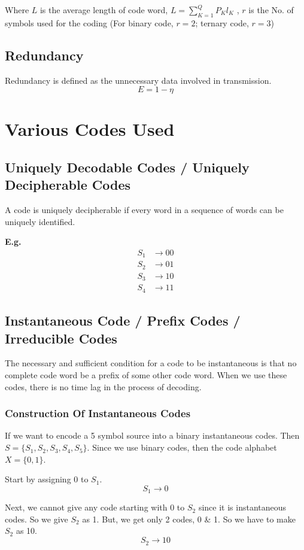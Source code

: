 \documentclass[12pt]{article}
\begin{document}
Where $L$ is the average length of code word, $L = \sum_{K=1}^{Q} P_K l_K$
, $r$ is the No. of symbols used for the coding (For binary code, $r=2$; ternary code, $r=3$)

\subsection{Redundancy}
Redundancy is defined as the unnecessary data involved in transmission.
$$E = 1 - \eta$$

\section{Various Codes Used}

\subsection{Uniquely Decodable Codes / Uniquely Decipherable Codes}
A code is uniquely decipherable if every word in a sequence of words can be uniquely identified.

\textbf{E.g.}
\begin{align*}
	S_1 & \rightarrow 00 \\
	S_2 & \rightarrow 01 \\
	S_3 & \rightarrow 10 \\
	S_4 & \rightarrow 11
\end{align*}

\subsection{Instantaneous Code / Prefix Codes / Irreducible Codes}
The necessary and sufficient condition for a code to be instantaneous is that no complete code word be a prefix of some other code word. When we use these codes, there is no time lag in the process of decoding.

\subsubsection{Construction Of Instantaneous Codes}
If we want to encode a 5 symbol source into a binary instantaneous codes. Then $S=\{S_1, S_2, S_3, S_4, S_5\}$. Since we use binary codes, then the code alphabet $X=\{0,1\}$.

Start by assigning 0 to $S_1$.
$$S_1 \rightarrow 0$$

Next, we cannot give any code starting with 0 to $S_2$ since it is instantaneous codes. So we give $S_2$ as 1. But, we get only 2 codes, 0 \& 1. So we have to make $S_2$ as 10.
$$S_2 \rightarrow 10$$
\end{document}
